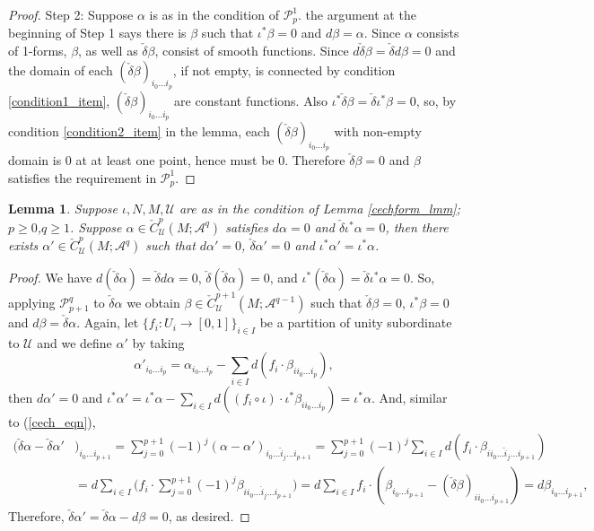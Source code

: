 \documentclass[11pt]{article}
\newtheorem{lmm}[thm]{Lemma}
\theoremstyle{definition}
\theoremstyle{remark}
\def\cA{\mathcal{A}}
\def\cP{\mathcal{P}}
\def\cU{\mathcal{U}}
\begin{document}
\begin{appendices}
\begin{proof}
Step 2: Suppose $\alpha$ is as in the condition of $\cP^1_p$. the argument at the beginning of Step 1 says there is $\beta$ such that $\iota^*\beta=0$ and $d\beta=\alpha$. 
Since $\alpha$ consists of 1-forms, $\beta$, as well as $\check\delta\beta$, consist of smooth functions. Since $d\check\delta\beta=\check\delta d\beta=0$ and the domain of each $(\check\delta\beta)_{i_0\ldots i_p}$, if not empty, is connected by condition \ref{condition1_item}, $(\check\delta\beta)_{i_0\ldots i_p}$ are constant functions. 
Also $\iota^*\check\delta\beta=\check\delta\iota^*\beta=0$, 
so, by condition \ref{condition2_item} in the lemma, each $(\check\delta\beta)_{i_0\ldots i_p}$ with non-empty domain is 0 at at least one point, hence must be 0. 
Therefore $\check\delta\beta=0$ and $\beta$ satisfies the requirement in $\cP^1_p$. 
\end{proof}
\begin{lmm}\label{cechform2_lmm}
Suppose $\iota,N,M,\cU$ are as in the condition of Lemma \ref{cechform_lmm}; $p\ge0$,$q\ge1$. Suppose $\alpha\in\check{C}^p_\cU(M;\cA^q)$ satisfies $d\alpha=0$ and $\check\delta\iota^*\alpha=0$, then there exists $\alpha'\in\check{C}^p_\cU(M;\cA^q)$ such that $d\alpha'=0$, $\check\delta\alpha'=0$ and $\iota^*\alpha'=\iota^*\alpha$. 
\end{lmm}
\begin{proof}
We have $d(\check\delta\alpha)=\check\delta d\alpha=0$, $\check\delta(\check\delta\alpha)=0$, and $\iota^*(\check\delta\alpha)=\check\delta\iota^*\alpha=0$. 
So, applying $\cP^q_{p+1}$ to $\check\delta\alpha$ we obtain $\beta\in\check{C}^{p+1}_\cU(M;\cA^{q-1})$ such that $\check\delta\beta=0$, $\iota^*\beta=0$ and $d\beta=\check\delta\alpha$. 
Again, let $\{f_i:U_i\to[0,1]\}_{i\in I}$ be a partition of unity subordinate to $\cU$ and we define $\alpha'$ by taking
$$\alpha'_{i_0\ldots i_p}=\alpha_{i_0\ldots i_p}-\sum_{i\in I}d(f_i\cdot \beta_{ii_0\ldots i_p}),$$
then $d\alpha'=0$ and $\iota^*\alpha'=\iota^*\alpha-\sum_{i\in I}d((f_i\circ\iota)\cdot\iota^*\beta_{ii_0\ldots i_p})=\iota^*\alpha$. And, similar to (\ref{cech_eqn}), 
\begin{align*}
(\check\delta\alpha-\check\delta\alpha'&)_{i_0\ldots i_{p+1}}
=\sum_{j=0}^{p+1}(-1)^j(\alpha-\alpha')_{i_0\ldots\hat{i}_j\ldots i_{p+1}}
=\sum_{j=0}^{p+1}(-1)^j\sum_{i\in I}d(f_i\cdot\beta_{ii_0\ldots\hat{i}_j\ldots i_{p+1}})\\
&=d\sum_{i\in I}\Big(f_i\cdot \sum_{j=0}^{p+1}(-1)^j\beta_{ii_0\ldots\hat{i}_j\ldots i_{p+1}} \Big)
=d\sum_{i\in I}f_i\cdot (\beta_{i_0\ldots i_{p+1}}-(\check\delta\beta)_{ii_0\ldots i_{p+1}})
=d\beta_{i_0\ldots i_{p+1}}, 
\end{align*}
Therefore, $\check\delta\alpha'=\check\delta\alpha-d\beta=0$, as desired. 
\end{proof}



\end{appendices}
\end{document}
